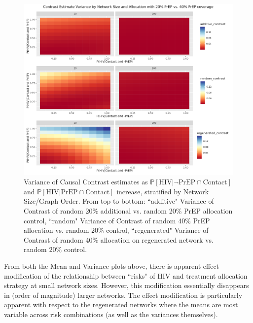 \documentclass{article}
\theoremstyle{definition}
\begin{document}
\begin{figure}[H]
    \centering
    \includegraphics[width=\linewidth]{Corrected Figures/Network Size Variance plots.png}
    \caption{Variance of Causal Contrast estimates  as $\mathbb{P}\left[\text{HIV} \vert \neg \text{PrEP} \cap \text{Contact}\right]$ and $\mathbb{P}\left[\text{HIV} \vert \text{PrEP} \cap \text{Contact}\right]$ increase, stratified by Network Size/Graph Order. From top to bottom: ``additive" Variance of Contrast of random 20\% additional vs. random 20\% PrEP allocation control, ``random" Variance of Contrast of random 40\% PrEP allocation vs. random 20\% control, ``regenerated" Variance of Contrast of random 40\% allocation on regenerated network vs. random 20\% control.}
    \label{fig:Figure S4.2}
\end{figure}
From both the Mean and Variance plots above, there is apparent effect modification of the relationship between ``risks" of HIV and treatment allocation strategy at small network sizes. However, this modification essentially disappears in (order of magnitude) larger networks. The effect modification is particularly apparent with respect to the regenerated networks where the means are most variable across risk combinations (as well as the variances themselves).  
\end{document}
